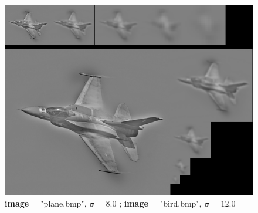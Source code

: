 \documentclass{article}
\begin{document}
\begin{figure}[hbt!]
	\centering
	\includegraphics[width=.9\textwidth]{assets/ex1-A/bird_plane_s12_s8.png}
	\caption{\textbf{image} = "plane.bmp", $\boldsymbol{\sigma} = 8.0$ ; \textbf{image} = "bird.bmp", $\boldsymbol{\sigma} = 12.0$}
\end{figure}

\newpage
\end{document}
